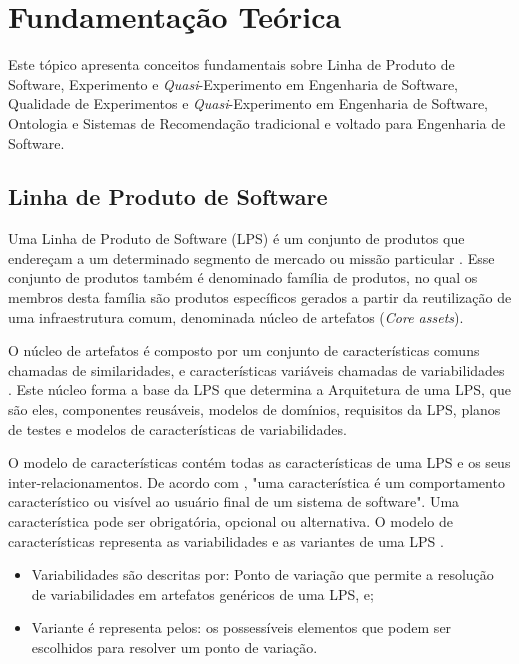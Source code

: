 \chapter{Fundamentação Teórica}
\label{sec:revisao}

Este tópico apresenta conceitos fundamentais sobre Linha de Produto de Software, Experimento e \textit{Quasi}-Experimento em Engenharia de Software, Qualidade de Experimentos e \textit{Quasi}-Experimento em Engenharia de Software, Ontologia e Sistemas de Recomendação tradicional e voltado para Engenharia de Software.

\section{Linha de Produto de Software}
\label{sec:lin_prod_software}

Uma Linha de Produto de Software (LPS) é um conjunto de produtos que endereçam a um determinado segmento de mercado ou missão particular \cite{northrop2007framework}. Esse conjunto de produtos também é denominado família de produtos, no qual os membros desta família são produtos específicos gerados a partir da reutilização de uma infraestrutura comum, denominada núcleo de artefatos (\textit{Core assets}). 

O núcleo de artefatos é composto por um conjunto de características comuns chamadas de similaridades, e características variáveis chamadas de variabilidades \cite{van2007product}. Este núcleo forma a base da LPS que determina a Arquitetura de uma LPS, que são eles, componentes reusáveis, modelos de domínios, requisitos da LPS, planos de testes e modelos de características de variabilidades.

O modelo de características contém todas as características de uma LPS e os seus inter-relacionamentos. De acordo com \citeauthor{apel2013analytic}, "uma característica é um comportamento característico ou visível ao usuário final de um sistema de software". Uma característica pode ser obrigatória, opcional ou alternativa. O modelo de características representa as variabilidades e as variantes de uma LPS \cite{apel2013analytic}.

\begin{itemize}
	\item Variabilidades são descritas por: Ponto de variação que permite a resolução de variabilidades em artefatos genéricos de uma LPS, e; 
	\item Variante é representa pelos: os possessíveis elementos que podem ser escolhidos para resolver um ponto de variação.
\end{itemize}

